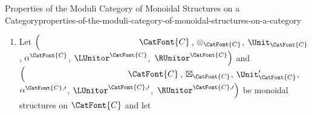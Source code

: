 \begin{proposition}{Properties of the Moduli Category of Monoidal Structures on a Category}{properties-of-the-moduli-category-of-monoidal-structures-on-a-category}
\begin{enumerate}
\begin{enumerate}
\[\begin{tikzcd}[row sep={5.0*\the\DL,between origins}, column sep={8.25*\the\DL,between origins}, background color=backgroundColor, ampersand replacement=\&]
                            \arrow[r,"\id^{\otimes}_{\Unit_{\CatFont{C}},\Unit'_{\CatFont{C}}}"]
                            \arrow[d,"\LUnitor^{\CatFont{C},\prime}_{\Unit_{\CatFont{C}}}"']
                            \&
                            \Unit'_{\CatFont{C}}\otimes_{\CatFont{C}}\Unit_{\CatFont{C}}
                            \arrow[d,"\RUnitor^{\CatFont{C}}_{\Unit'_{\CatFont{C}}}"]
                            \\
                            \Unit_{\CatFont{C}}
                            \arrow[r,"\id^{\otimes,-1}_{\Unit}"']
                            \&
                            \Unit'_{\CatFont{C}}
                        \end{tikzcd}
                    \]%
                    commutes.
                \item\label{properties-of-the-moduli-category-of-monoidal-structures-on-a-category-extra-monoidal-unity-constraints-4}The diagram
                    \[
                        \begin{tikzcd}[row sep={5.0*\the\DL,between origins}, column sep={8.25*\the\DL,between origins}, background color=backgroundColor, ampersand replacement=\&]
                            \Unit_{\CatFont{C}}\boxtimes_{\CatFont{C}}\Unit'_{\CatFont{C}}
                            \arrow[r,"\id^{\otimes}_{\Unit_{\CatFont{C}},\Unit'_{\CatFont{C}}}"]
                            \arrow[d,"\RUnitor^{\CatFont{C},\prime}_{\Unit_{\CatFont{C}}}"']
                            \&
                            \Unit_{\CatFont{C}}\otimes_{\CatFont{C}}\Unit'_{\CatFont{C}}
                            \arrow[d,"\LUnitor^{\CatFont{C}}_{\Unit'_{\CatFont{C}}}"]
                            \\
                            \Unit_{\CatFont{C}}
                            \arrow[r,"\id^{\otimes,-1}_{\Unit}"']
                            \&
                            \Unit'_{\CatFont{C}}
                        \end{tikzcd}
                    \]%
                    commutes.
            \end{enumerate}
        \item\label{properties-of-the-moduli-category-of-monoidal-structures-on-a-category-mixed-associators}Let $\left(\phantom{\mrp{\LUnitor^{\CatFont{C}}}}\CatFont{C}\right.$, $\otimes_{\CatFont{C}}$, $\Unit_{\CatFont{C}}$, $\alpha^{\CatFont{C}}$, $\LUnitor^{\CatFont{C}}$, $\left.\RUnitor^{\CatFont{C}}\right)$ and $\left(\phantom{\mrp{\LUnitor^{\CatFont{C},\prime}}}\CatFont{C}\right.$, $\boxtimes_{\CatFont{C}}$, $\Unit'_{\CatFont{C}}$, $\alpha^{\CatFont{C},\prime}$, $\LUnitor^{\CatFont{C},\prime}$, $\left.\RUnitor^{\CatFont{C},\prime}\right)$ be monoidal structures on $\CatFont{C}$ and let

\end{enumerate}
\end{proposition}

